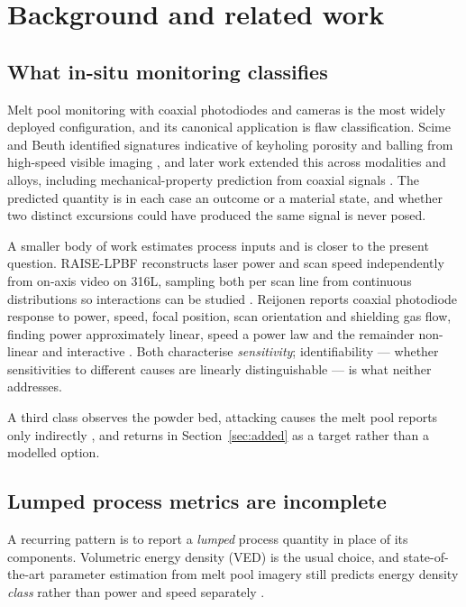 \documentclass[final,5p,times,twocolumn]{elsarticle}
\begin{document}
\section{Background and related work}

\subsection{What in-situ monitoring classifies}

Melt pool monitoring with coaxial photodiodes and cameras is the most widely
deployed configuration, and its canonical application is flaw classification.
Scime and Beuth identified signatures indicative of keyholing porosity and
balling from high-speed visible imaging \cite{Scime2019}, and later work extended
this across modalities and alloys, including mechanical-property prediction from
coaxial signals \cite{Raj2023}. The predicted quantity is in each case an outcome
or a material state, and whether two distinct excursions could have produced the
same signal is never posed.

A smaller body of work estimates process inputs and is closer to the present
question. RAISE-LPBF reconstructs laser power and scan speed independently from
on-axis video on 316L, sampling both per scan line from continuous distributions
so interactions can be studied \cite{Blanc2024}. Reijonen reports coaxial
photodiode response to power, speed, focal position, scan orientation and
shielding gas flow, finding power approximately linear, speed a power law and the
remainder non-linear and interactive \cite{Reijonen2024}. Both characterise
\emph{sensitivity}; identifiability --- whether sensitivities to different causes
are linearly distinguishable --- is what neither addresses.

A third class observes the powder bed, attacking causes the melt pool reports
only indirectly \cite{Liu2022,Bugatti2022}, and returns in
Section~\ref{sec:added} as a target rather than a modelled option.

\subsection{Lumped process metrics are incomplete}

A recurring pattern is to report a \emph{lumped} process quantity in place of its
components. Volumetric energy density (VED) is the usual choice, and
state-of-the-art parameter estimation from melt pool imagery still predicts
energy density \emph{class} rather than power and speed separately \cite{kNN2025}.
\end{document}
